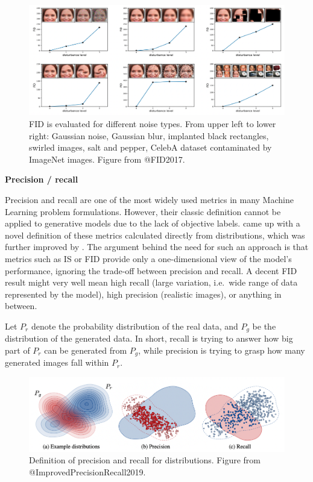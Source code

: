 \documentclass[
]{krantz}
\begin{document}
\begin{figure}

{\centering \includegraphics[width=1\linewidth]{figures/02-02-text-2-img/fiddistortions} 

}

\caption{FID is evaluated for different noise types. From upper left to lower right: Gaussian noise, Gaussian blur, implanted black rectangles, swirled images, salt and pepper, CelebA dataset contaminated by ImageNet images. Figure from @FID2017.}\label{fig:fiddistortions}
\end{figure}

\textbf{Precision / recall}

Precision and recall are one of the most widely used metrics in many Machine Learning problem formulations. However, their classic definition cannot be applied to generative models due to the lack of objective labels. \citet{GenerativePrecisionRecall2018} came up with a novel definition of these metrics calculated directly from distributions, which was further improved by \citet{ImprovedPrecisionRecall2019}. The argument behind the need for such an approach is that metrics such as IS or FID provide only a one-dimensional view of the model's performance, ignoring the trade-off between precision and recall. A decent FID result might very well mean high recall (large variation, i.e.~wide range of data represented by the model), high precision (realistic images), or anything in between.

Let \(P_{r}\) denote the probability distribution of the real data, and \(P_{g}\) be the distribution of the generated data. In short, recall is trying to answer how big part of \(P_{r}\) can be generated from \(P_{g}\), while precision is trying to grasp how many generated images fall within \(P_{r}\).

\begin{figure}

{\centering \includegraphics[width=0.8\linewidth]{figures/02-02-text-2-img/precisionandrecall} 

}

\caption{Definition of precision and recall for distributions. Figure from @ImprovedPrecisionRecall2019.}\label{fig:precisionandrecall}
\end{figure}
\end{document}
